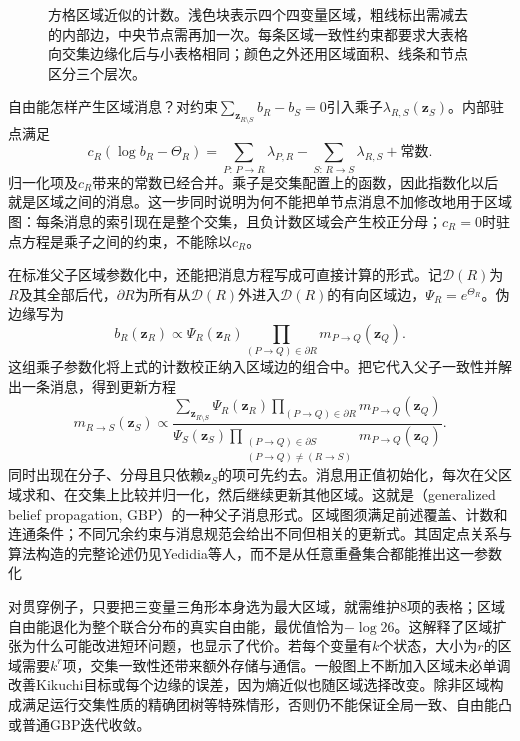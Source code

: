 \begin{figure}[htbp]
  \centering
  
  \caption{方格区域近似的计数。浅色块表示四个四变量区域，粗线标出需减去的内部边，中央节点需再加一次。每条区域一致性约束都要求大表格向交集边缘化后与小表格相同；颜色之外还用区域面积、线条和节点区分三个层次。}
  \label{fig:pgm-variational-regions}
\end{figure}

自由能怎样产生区域消息？对约束$\sum_{\bm z_{R\setminus S}}b_R-b_S=0$引入乘子$\lambda_{R,S}(\bm z_S)$。内部驻点满足
\begin{equation}
  c_R(\log b_R-\Theta_R)
    =\sum_{P:\,P\to R}\lambda_{P,R}
       -\sum_{S:\,R\to S}\lambda_{R,S}+\text{常数}.
  \label{eq:pgm-variational-region-stationarity}
\end{equation}
归一化项及$c_R$带来的常数已经合并。乘子是交集配置上的函数，因此指数化以后就是区域之间的消息。这一步同时说明为何不能把单节点消息不加修改地用于区域图：每条消息的索引现在是整个交集，且负计数区域会产生校正分母；$c_R=0$时驻点方程是乘子之间的约束，不能除以$c_R$。

在标准父子区域参数化中，还能把消息方程写成可直接计算的形式。记$\mathcal D(R)$为$R$及其全部后代，$\partial R$为所有从$\mathcal D(R)$外进入$\mathcal D(R)$的有向区域边，$\Psi_R=e^{\Theta_R}$。伪边缘写为
\[
  b_R(\bm z_R)\propto
    \Psi_R(\bm z_R)
       \prod_{(P\to Q)\in\partial R}m_{P\to Q}(\bm z_Q).
\]
这组乘子参数化将上式的计数校正纳入区域边的组合中。把它代入父子一致性并解出一条消息，得到更新方程
\begin{equation}
  m_{R\to S}(\bm z_S)\propto
  \frac{\displaystyle
    \sum_{\bm z_{R\setminus S}}
      \Psi_R(\bm z_R)
       \prod_{(P\to Q)\in\partial R}m_{P\to Q}(\bm z_Q)}
  {\displaystyle
    \Psi_S(\bm z_S)
       \prod_{\substack{(P\to Q)\in\partial S\\(P\to Q)\ne(R\to S)}}
          m_{P\to Q}(\bm z_Q)}.
  \label{eq:pgm-variational-gbp}
\end{equation}
同时出现在分子、分母且只依赖$\bm z_S$的项可先约去。消息用正值初始化，每次在父区域求和、在交集上比较并归一化，然后继续更新其他区域。这就是（generalized belief propagation, GBP）的一种父子消息形式。区域图须满足前述覆盖、计数和连通条件；不同冗余约束与消息规范会给出不同但相关的更新式。其固定点关系与算法构造的完整论述仍见Yedidia等人，而不是从任意重叠集合都能推出这一参数化

对贯穿例子，只要把三变量三角形本身选为最大区域，就需维护$8$项的表格；区域自由能退化为整个联合分布的真实自由能，最优值恰为$-\log26$。这解释了区域扩张为什么可能改进短环问题，也显示了代价。若每个变量有$k$个状态，大小为$r$的区域需要$k^r$项，交集一致性还带来额外存储与通信。一般图上不断加入区域未必单调改善Kikuchi目标或每个边缘的误差，因为熵近似也随区域选择改变。除非区域构成满足运行交集性质的精确团树等特殊情形，否则仍不能保证全局一致、自由能凸或普通GBP迭代收敛。

